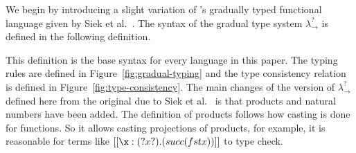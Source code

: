 \newcommand{\GSTLC}{\lambda^?_\to}
\newcommand{\CGSTLC}{\lambda^{\Rightarrow}_\to}
We begin by introducing a slight variation of \cite{Siek:2006}'s
gradually typed functional language given by Siek et
al.~\cite{Siek:2015}.  The syntax of the gradual type system $\GSTLC$
is defined in the following definition.

This definition is the base syntax for every language in this paper.
The typing rules are defined in Figure~\ref{fig:gradual-typing} and
the type consistency relation is defined in
Figure~\ref{fig:type-consistency}.  The main changes of the version of
$\GSTLC$ defined here from the original due to Siek et
al.~\cite{Siek:2015} is that products and natural numbers have been
added.  The definition of products follows how casting is done for
functions. So it allows casting projections of products, for example,
it is reasonable for terms like $[[\x:(? x ?).(succ (fst x))]]$ to
type check.
\renewcommand{\GSiekdrulereflName}[0]{\text{refl}}
\renewcommand{\GSiekdruleboxName}[0]{\text{box}}
\renewcommand{\GSiekdruleunboxName}[0]{\text{unbox}}
\renewcommand{\GSiekdrulearrowName}[0]{\to}
\renewcommand{\GSiekdruleprodName}[0]{\times}
